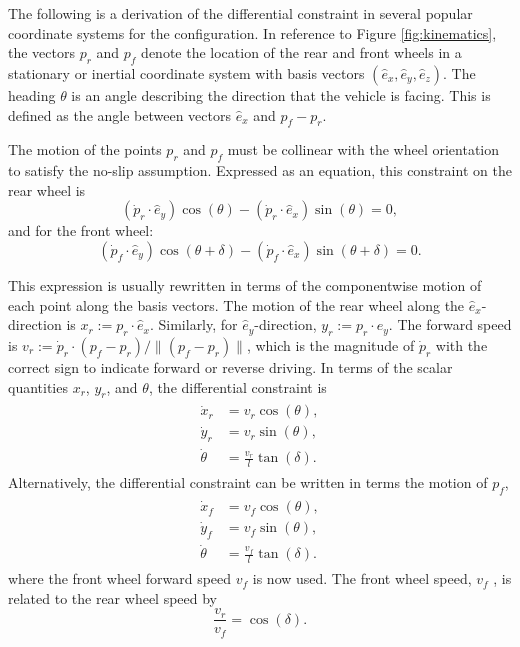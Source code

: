 The following is a derivation of the differential constraint in several popular coordinate systems for the configuration. In reference to Figure \ref{fig:kinematics}, the vectors $p_r$ and $p_f$ denote the location of the rear and front wheels in a stationary or inertial coordinate system with basis vectors $(\hat{e}_x, \hat{e}_y, \hat{e}_z)$. The heading $\theta$ is an angle describing the direction that the vehicle is facing. This is defined as the angle between vectors $\hat{e}_x$ and $p_f-p_r$.

The motion of the points $p_r$ and $p_f$ must be collinear with the wheel orientation to satisfy the no-slip assumption. Expressed as an equation, this constraint on the rear wheel is
\begin{equation}
(\dot{p}_r\cdot \hat{e}_y)\cos(\theta)-(\dot{p}_r\cdot \hat{e}_x)\sin(\theta)=0,
\end{equation}
and for the front wheel:
\begin{equation}
(\dot{p}_f\cdot \hat{e}_y)\cos(\theta+\delta)-(\dot{p}_f\cdot \hat{e}_x)\sin(\theta+\delta)=0.
\end{equation}

This expression is usually rewritten in terms of the componentwise motion of each point along the basis vectors. The motion of the rear wheel along the $\hat{e}_x$-direction is $x_r := p_r\cdot\hat{e}_x$. Similarly, for $\hat{e}_y$-direction, $y_r:=p_r\cdot \hat{e}_y$. The forward speed is $v_r:=\dot{p}_r\cdot(p_f-p_r)/\|(p_f-p_r)\|$, which is the magnitude of $\dot{p}_r$ with the correct sign to indicate forward or reverse driving. In terms of the scalar quantities $x_r$, $y_r$, and $\theta$, the differential constraint is
\begin{align}
\begin{split}
\dot{x}_r&= v_r\cos(\theta),\\
\dot{y}_r&= v_r\sin(\theta),\\
\dot{\theta}&=\frac{v_r}{l}\tan(\delta).
\end{split}
\end{align}
Alternatively, the differential constraint can be written in terms the motion of $p_f$,
\begin{align}
\begin{split}
\dot{x}_f&= v_f\cos(\theta),\\
\dot{y}_f&= v_f\sin(\theta),\\
\dot{\theta}&=\frac{v_f}{l}\tan(\delta).
\end{split}
\label{eq:vf}
\end{align}
where the front wheel forward speed $v_f$ is now used. The front wheel speed, $v_f$ , is related to the rear wheel speed by
\begin{equation}
\frac{v_r}{v_f}=\cos(\delta).
\end{equation}

